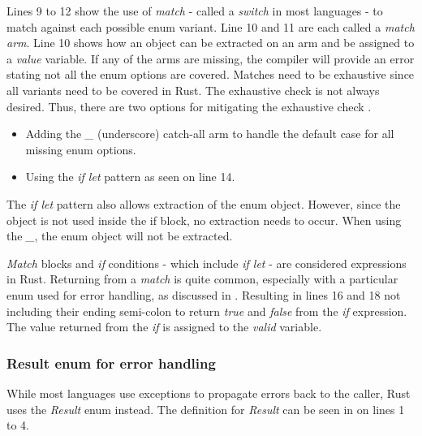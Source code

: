 
Lines 9 to 12 show the use of \textit{match} - called a \textit{switch} in most languages - to match against each possible enum variant.
Line 10 and 11 are each called a \textit{match arm}.
Line 10 shows how an object can be extracted on an arm and be assigned to a \textit{value} variable.
If any of the arms are missing, the compiler will provide an error stating not all the enum options are covered.
Matches need to be exhaustive since all variants need to be covered in Rust.
The exhaustive check is not always desired.
Thus, there are two options for mitigating the exhaustive check \cite{klabnik_2019_01}.

\begin{itemize}
	\item Adding the \textit{\_} (underscore) catch-all arm to handle the default case for all missing enum options.
	\item Using the \textit{if let} pattern as seen on line 14.
\end{itemize}

The \textit{if let} pattern also allows extraction of the enum object.
However, since the object is not used inside the if block, no extraction needs to occur.
When using the \textit{\_}, the enum object will not be extracted.

\textit{Match} blocks and \textit{if} conditions - which include \textit{if let} - are considered expressions in Rust.
Returning from a \textit{match} is quite common, especially with a particular enum used for error handling, as discussed in .
Resulting in lines 16 and 18 not including their ending semi-colon to return \textit{true} and \textit{false} from the \textit{if} expression.
The value returned from the \textit{if} is assigned to the \textit{valid} variable.

\subsubsection{Result enum for error handling}
\label{sec:result-enum}
While most languages use exceptions to propagate errors back to the caller, Rust uses the \textit{Result} enum instead.
The definition for \textit{Result} can be seen in  on lines 1 to 4.


